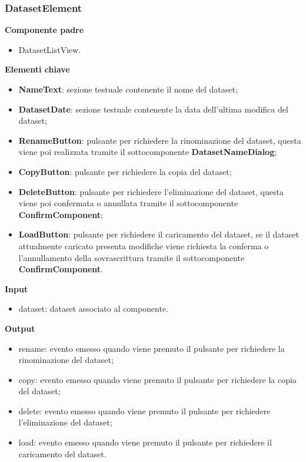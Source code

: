 \subsubsection{DatasetElement}
\textbf{Componente padre}
\begin{itemize}
    \item DatasetListView.
\end{itemize}
\textbf{Elementi chiave}
\begin{itemize}
    \item \textbf{NameText}: sezione testuale contenente il nome del dataset;
    \item \textbf{DatasetDate}: sezione testuale contenente la data dell'ultima modifica del dataset;
    \item \textbf{RenameButton}: pulsante per richiedere la rinominazione del dataset, questa viene poi realizzata tramite il sottocomponente \textbf{DatasetNameDialog};
    \item \textbf{CopyButton}: pulsante per richiedere la copia del dataset;
    \item \textbf{DeleteButton}: pulsante per richiedere l'eliminazione del dataset, questa viene poi confermata o annullata tramite il sottocomponente \textbf{ConfirmComponent};
    \item \textbf{LoadButton}: pulsante per richiedere il caricamento del dataset, se il dataset attualmente caricato presenta modifiche viene richiesta la conferma o l'annullamento della sovrascrittura tramite il sottocomponente \textbf{ConfirmComponent}.
\end{itemize}
\textbf{Input}
\begin{itemize}
    \item dataset: dataset associato al componente.
\end{itemize}
\textbf{Output}
\begin{itemize}
    \item rename: evento emesso quando viene premuto il pulsante per richiedere la rinominazione del dataset;
    \item copy: evento emesso quando viene premuto il pulsante per richiedere la copia del dataset;
    \item delete: evento emesso quando viene premuto il pulsante per richiedere l'eliminazione del dataset;
    \item load: evento emesso quando viene premuto il pulsante per richiedere il caricamento del dataset.
\end{itemize}

